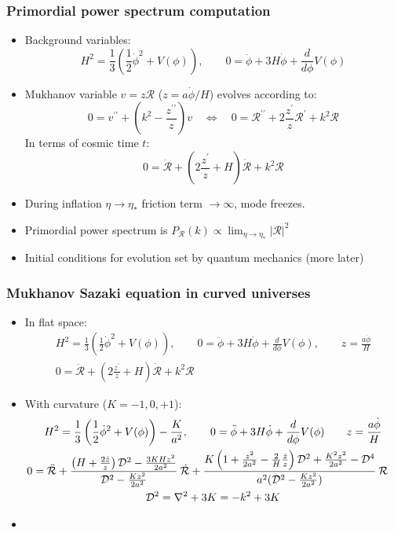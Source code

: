 \documentclass[%
]{beamer}
\begin{document}
\begin{frame}
    \frametitle{Primordial power spectrum computation}
    \begin{itemize}
        \item Background variables:
            \[ H^2 = \frac{1}{3}\left( \frac{1}{2}\dot\phi^2 + V(\phi) \right), \qquad 0=\ddot{\phi} + 3 H \dot{\phi} + \frac{d}{d\phi}V(\phi) \]
        \item Mukhanov variable $v= z\mathcal{R}$ ($z=a \dot{\phi}/H$) evolves according to:
            \[ 0 = v^{\prime\prime} + \left(k^2 - \frac{z^{\prime\prime}}{z}\right) v 
            \quad\Leftrightarrow\quad 0 = \mathcal{R}^{\prime\prime} + 2\frac{z^\prime}{z} \mathcal{R}^\prime + k^2 \mathcal{R} \]
    In terms of cosmic time $t$:
    \[ 
    0 = \ddot{\mathcal{R}} + \left(2\frac{z^\prime}{z}+H\right) \dot{\mathcal{R}} + k^2 \mathcal{R} 
\]
        \item During inflation $\eta\to\eta_*$ friction term $\to\infty$, mode freezes.
        \item Primordial power spectrum is $P_\mathcal{R}(k)\propto\lim_{\eta\to\eta_*} |\mathcal{R}|^2$
        \item Initial conditions for evolution set by quantum mechanics (more later)
    \end{itemize}
\end{frame}

\begin{frame}
    \frametitle{Mukhanov Sazaki equation in curved universes}

    \begin{itemize}
        \item In flat space:
        \begin{gather}
            H^2 = \frac{1}{3}\left( \frac{1}{2}\dot\phi^2 + V(\phi) \right), \qquad 0=\ddot{\phi} + 3 H \dot{\phi} + \frac{d}{d\phi}V(\phi), \qquad z=\frac{a \dot{\phi}}{H} \nonumber\\
            0 = \ddot{\mathcal{R}} + \left(2\frac{z^\prime}{z}+H\right) \dot{\mathcal{R}} + k^2 \mathcal{R} \nonumber
        \end{gather}
    \item With curvature ($K=-1,0,+1$):
        \begin{gather}
            H^2 = \frac{1}{3}\left( \frac{1}{2}\dot\phi^2 + V(\phi) \right) - \frac{K}{a^2}, \qquad 0=\ddot{\phi} + 3 H \dot{\phi} + \frac{d}{d\phi}V(\phi) \qquad z=\frac{a \dot{\phi}}{H}\nonumber\\
            \hspace{-10pt}0=\ddot{\mathcal{R}} + \frac{\left( H + \frac{2\dot z}{z} \right)\mathcal{D}^2 - \frac{3K H z^2}{2a^2}}{\mathcal{D}^2 - \frac{Kz^2}{2a^2}}\:\dot{\mathcal{R}}
            +\frac{K\left(1+\frac{z^2}{2a^2} - \frac{2}{H}\frac{\dot{z}}{z}\right)\mathcal{D}^2 + \frac{K^2z^2}{2a^2}-\mathcal{D}^4}{a^2(\mathcal{D}^2 - \frac{Kz^2}{2a^2})}\:\mathcal{R}\nonumber\\
            \mathcal{D}^2 = \nabla^2 +3K = -k^2 + 3K \nonumber
        \end{gather}
    \item  {}
    \end{itemize}
\end{frame}
\end{document}
